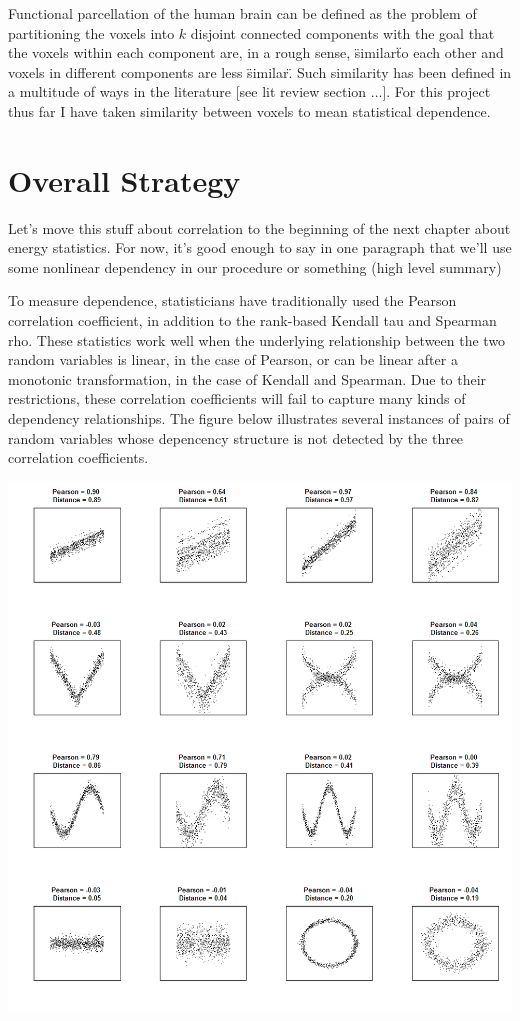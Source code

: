 Functional parcellation of the human brain can be defined as the problem
of partitioning the voxels into $k$ disjoint connected components with
the goal that the voxels within each component are, in a rough sense,
\"similar\" to each other and voxels in different components are less
\"similar\". Such similarity has been defined in a multitude of ways in
the literature [see lit review section ...]. For this project thus far I
have taken similarity between voxels to mean statistical dependence.

\section{Overall Strategy}
{\color{red}
Let's move this stuff about correlation to the beginning of the next
chapter about energy statistics. For now, it's good enough to say in one paragraph that we'll use some nonlinear dependency in our procedure or
something (high level summary)}

To measure dependence, statisticians have traditionally used the Pearson
correlation coefficient, in addition to the rank-based Kendall tau and
Spearman rho. These statistics work well when the underlying
relationship between the two random variables is linear, in the case of
Pearson, or can be linear after a monotonic transformation, in the case
of Kendall and Spearman. Due to their restrictions, these correlation
coefficients will fail to capture many kinds of dependency
relationships. The figure below illustrates several instances of pairs
of random variables whose depencency structure is not detected by the
three correlation coefficients.

\includegraphics[scale = 0.8]{figs/1_nonlinear_depend.png}

